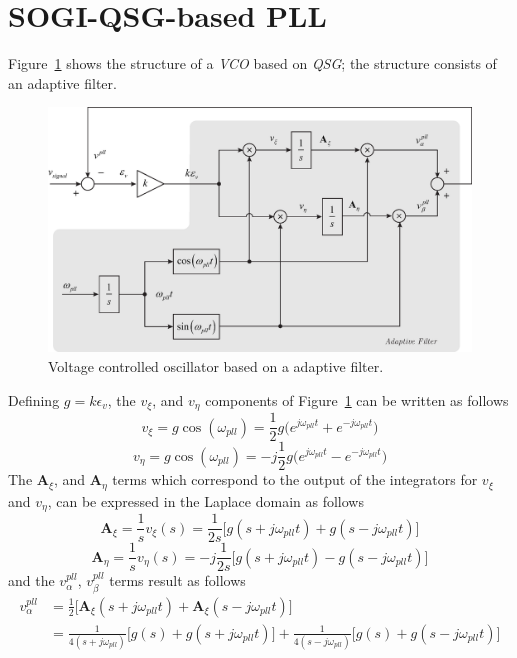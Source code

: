\documentclass[11pt,a4paper,oneside]{book}
\numberwithin{equation}{section}
\theoremstyle{it}
\theoremstyle{definition}
\begin{document}
\section{SOGI-QSG-based PLL}
Figure~\ref{vco_1} shows the structure of a \textit{VCO} based on \textit{QSG}; the structure consists of an adaptive filter.  
\begin{figure}[H]
	\centering
	\includegraphics[width = 400pt, angle = 0, keepaspectratio]{figures/vco_1.eps}
	\captionsetup{width=0.5\textwidth, font=small}
	\caption{Voltage controlled oscillator based on a adaptive filter.}
	\label{vco_1}
\end{figure}
Defining $g=k\epsilon_{v}$, the $v_\xi$, and $v_\eta$ components of Figure~\ref{vco_1} can be written as follows
\begin{equation}
	v_\xi=g\cos(\omega_{pll})=\frac{1}{2} g \Big(e^{j\omega_{pll}t}+e^{-j\omega_{pll}t}\Big)
\end{equation}
\begin{equation}
	v_\eta=g\cos(\omega_{pll})=-j\frac{1}{2} g \Big(e^{j\omega_{pll}t}-e^{-j\omega_{pll}t}\Big)
\end{equation}
The $\mathbf{A}_\xi$, and $\mathbf{A}_\eta$ terms which correspond to the output of the integrators for $v_\xi$ and $v_\eta$, can be expressed in the Laplace domain as follows
\begin{equation}
	\mathbf{A}_{\xi} = \frac{1}{s} v_\xi(s) = \frac{1}{2s}\Big[g(s+j\omega_{pll}t)+g(s-j\omega_{pll}t)\Big]
\end{equation}
\begin{equation}
	\mathbf{A}_{\eta} = \frac{1}{s} v_\eta(s) = -j\frac{1}{2s}\Big[g(s+j\omega_{pll}t)-g(s-j\omega_{pll}t)\Big]
\end{equation}
and the $v_\alpha^{pll}$, $v_\beta^{pll}$ terms result as follows
\begin{equation}
	\begin{aligned}
		v_\alpha^{pll} &=\frac{1}{2} \Big[\mathbf{A}_\xi(s+j\omega_{pll}t)+\mathbf{A}_\xi(s-j\omega_{pll}t)\Big] \\[6pt]
		&= \frac{1}{4(s+j\omega_{pll})}\Big[g(s)+g(s+j\omega_{pll}t)\Big]+\frac{1}{4(s-j\omega_{pll})}\Big[g(s)+g(s-j\omega_{pll}t)\Big]
	\end{aligned}
\end{equation}
\end{document}
